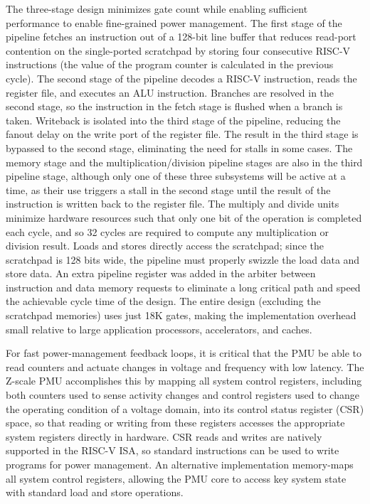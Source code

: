 \documentclass[graybox]{svmult}
\begin{document}
The three-stage design minimizes gate count while enabling sufficient performance to enable fine-grained power management.
The first stage of the pipeline fetches an instruction out of a 128-bit line buffer that reduces read-port contention on the single-ported scratchpad by storing four consecutive RISC-V instructions (the value of the program counter is calculated in the previous cycle).
The second stage of the pipeline decodes a RISC-V instruction, reads the register file, and executes an ALU instruction.
Branches are resolved in the second stage, so the instruction in the fetch stage is flushed when a branch is taken.
Writeback is isolated into the third stage of the pipeline, reducing the fanout delay on the write port of the register file.
The result in the third stage is bypassed to the second stage, eliminating the need for stalls in some cases.
The memory stage and the multiplication/division pipeline stages are also in the third pipeline stage, although only one of these three subsystems will be active at a time, as their use triggers a stall in the second stage until the result of the instruction is written back to the register file.
The multiply and divide units minimize hardware resources such that only one bit of the operation is completed each cycle, and so 32 cycles are required to compute any multiplication or division result.
Loads and stores directly access the scratchpad; since the scratchpad is 128 bits wide, the pipeline must properly swizzle the load data and store data.
An extra pipeline register was added in the arbiter between instruction and data memory requests to eliminate a long critical path and speed the achievable cycle time of the design.
The entire design (excluding the scratchpad memories) uses just 18K gates, making the implementation overhead small relative to large application processors, accelerators, and caches.

For fast power-management feedback loops, it is critical that the PMU be able to read counters and actuate changes in voltage and frequency with low latency.
The Z-scale PMU accomplishes this by mapping all system control registers, including both counters used to sense activity changes and control registers used to change the operating condition of a voltage domain, into its control status register (CSR) space, so that reading or writing from these registers accesses the appropriate system registers directly in hardware.
CSR reads and writes are natively supported in the RISC-V ISA, so standard instructions can be used to write programs for power management.
An alternative implementation memory-maps all system control registers, allowing the PMU core to access key system state with standard load and store operations.
\end{document}
